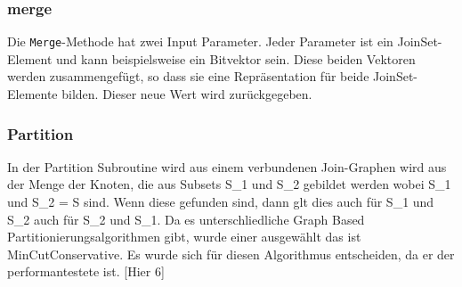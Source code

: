 \subsubsection{merge}

Die \texttt{Merge}-Methode hat zwei Input Parameter. Jeder Parameter ist ein JoinSet-Element und kann beispielsweise ein Bitvektor sein. Diese beiden Vektoren werden zusammengefügt, so dass sie eine Repräsentation für beide JoinSet-Elemente bilden. Dieser neue Wert wird zurückgegeben.


\subsubsection{Partition}

In der Partition Subroutine wird aus einem verbundenen Join-Graphen wird aus der Menge der Knoten, die aus Subsets S_1 und S_2 gebildet werden wobei S_1 und S_2 = S sind. Wenn diese gefunden sind, dann glt dies auch für S_1 und S_2 auch für S_2 und S_1. Da es unterschliedliche Graph Based Partitionierungsalgorithmen gibt, wurde einer ausgewählt das ist MinCutConservative. Es wurde sich für diesen Algorithmus entscheiden, da er der performantestete ist. [Hier 6]





